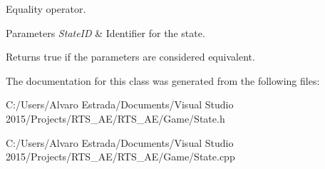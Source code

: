 Equality operator. 


\begin{DoxyParams}{Parameters}
{\em State\+ID} & Identifier for the state.\\
\hline
\end{DoxyParams}
\begin{DoxyReturn}{Returns}
true if the parameters are considered equivalent. 
\end{DoxyReturn}


The documentation for this class was generated from the following files\+:\begin{DoxyCompactItemize}
\item 
C\+:/\+Users/\+Alvaro Estrada/\+Documents/\+Visual Studio 2015/\+Projects/\+R\+T\+S\+\_\+\+A\+E/\+R\+T\+S\+\_\+\+A\+E/\+Game/State.\+h\item 
C\+:/\+Users/\+Alvaro Estrada/\+Documents/\+Visual Studio 2015/\+Projects/\+R\+T\+S\+\_\+\+A\+E/\+R\+T\+S\+\_\+\+A\+E/\+Game/State.\+cpp\end{DoxyCompactItemize}
